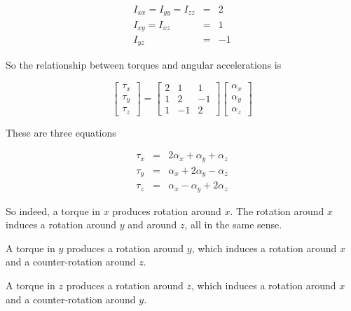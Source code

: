 \begin{eqnarray}
I_{xx}=I_{yy}=I_{zz}&=&2\\
I_{xy}=I_{xz}&=&1\\
I_{yz}&=&-1
\end{eqnarray}


So the relationship between torques and angular accelerations is 

\begin{equation}
\left[\begin{array}{c}
\tau_x\\
\tau_y\\
\tau_z
\end{array}\right] = \left[\begin{array}{ccc}
2 & 1 & 1 \\
1 & 2 & -1 \\
1 & -1 & 2
\end{array}\right] 
\left[\begin{array}{c}
\alpha_x\\
\alpha_y\\
\alpha_z
\end{array}\right] 
\end{equation}

These are three equations 

\begin{eqnarray}
\tau_x &=& 2\alpha_x + \alpha_y  + \alpha_z \\
\tau_y &=& \alpha_x + 2\alpha_y  - \alpha_z \\
\tau_z &=& \alpha_x - \alpha_y + 2\alpha_z
\end{eqnarray}


So indeed, a torque in $x$ produces rotation around $x$. The rotation around $x$ induces a rotation around $y$ and around $z$, all in the same sense. 


A torque in $y$ produces a rotation around $y$, which induces a rotation around $x$ and a counter-rotation around $z$.

A torque in $z$ produces a rotation around $z$, which induces a
rotation around $x$ and a counter-rotation around $y$.